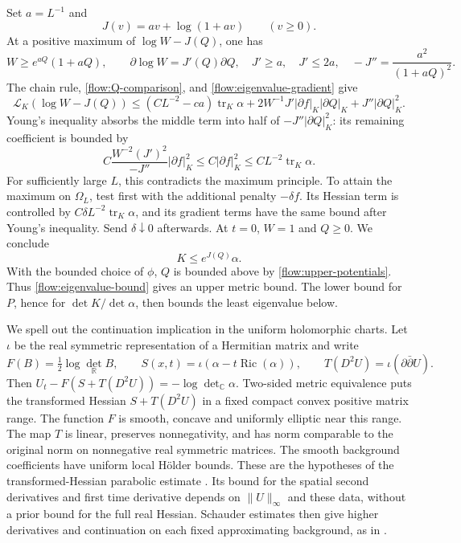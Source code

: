 \documentclass[11pt]{article}
\theoremstyle{definition}
\theoremstyle{remark}
\newcommand{\C}{\mathbb C}
\newcommand{\R}{\mathbb R}
\newcommand{\dd}{\partial\bar\partial}
\DeclareMathOperator{\Ric}{Ric}
\DeclareMathOperator{\tr}{tr}
\numberwithin{equation}{section}
\begin{document}
Set $a=L^{-1}$ and
\[
 J(v)=av+\log(1+av)\qquad(v\ge0).
\]
At a positive maximum of $\log W-J(Q)$, one has
\[
 W\ge e^{aQ}(1+aQ),\qquad
 \partial\log W=J'(Q)\partial Q,
 \quad J'\ge a,\quad J'\le2a,\quad
 -J''=\frac{a^2}{(1+aQ)^2}.
\]
The chain rule, \eqref{flow:Q-comparison}, and
\eqref{flow:eigenvalue-gradient} give
\[
 \mathscr L_K(\log W-J(Q))
 \le (CL^{-2}-ca)\tr_K\alpha
 +2W^{-1}J'|\partial f|_K|\partial Q|_K
 +J''|\partial Q|_K^2.
\]
Young's inequality absorbs the middle term into half of
$-J''|\partial Q|_K^2$: its remaining coefficient is bounded by
\[
 C\frac{W^{-2}(J')^2}{-J''}|\partial f|_K^2
 \le C|\partial f|_K^2
 \le CL^{-2}\tr_K\alpha.
\]
For sufficiently large $L$, this contradicts the maximum principle.
To attain the maximum on $\Omega_L$, test first with the additional
penalty $-\delta f$.  Its Hessian term is controlled by
$C\delta L^{-2}\tr_K\alpha$, and its gradient terms have the same
bound after Young's inequality.  Send $\delta\downarrow0$ afterwards.
At $t=0$, $W=1$ and $Q\ge0$.  We conclude
\begin{equation}\label{flow:eigenvalue-bound}
 K\le e^{J(Q)}\alpha.
\end{equation}
With the bounded choice of $\phi$, $Q$ is bounded above by
\eqref{flow:upper-potentials}.  Thus \eqref{flow:eigenvalue-bound}
gives an upper metric bound.  The lower bound for $P$, hence for
$\det K/\det\alpha$, then bounds the least eigenvalue below.

We spell out the continuation implication in the uniform holomorphic
charts.  Let $\iota$ be the real symmetric representation of a Hermitian
matrix and write
\[
 F(B)=\tfrac12\log\det_{\R}B,\qquad
 S(x,t)=\iota(\alpha-t\Ric(\alpha)),\qquad
 T(D^2U)=\iota(\dd U).
\]
Then $U_t-F(S+T(D^2U))=-\log\det_{\C}\alpha$.
Two-sided metric equivalence puts the transformed Hessian $S+T(D^2U)$
in a fixed compact convex positive matrix range.  The function $F$
is smooth, concave and uniformly elliptic near this range.  The map
$T$ is linear, preserves nonnegativity, and has norm comparable to
the original norm on nonnegative real symmetric matrices.  The smooth
background coefficients have uniform local H\"older bounds.
These are the hypotheses of the transformed-Hessian parabolic
estimate \cite[Theorem~5.1]{ChuRegularity}.  Its bound for the spatial
second derivatives and first time derivative depends on $\|U\|_\infty$
and these data, without a prior bound for the full real Hessian.
Schauder estimates then give higher derivatives and continuation on
each fixed approximating background, as in
\cite[proof of Theorem~4.1]{LeeTam}.
\end{document}
